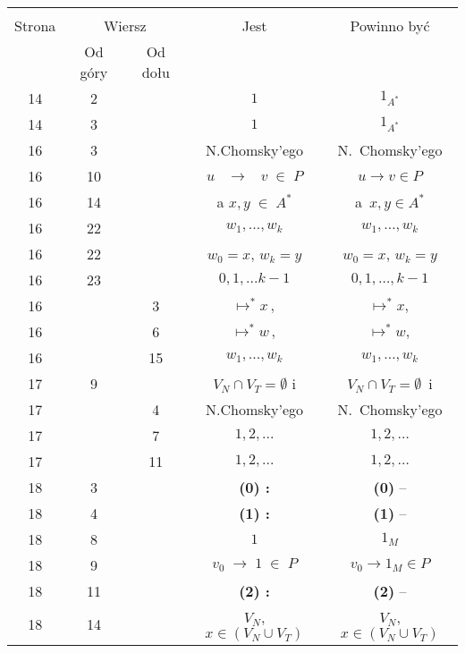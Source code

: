 \documentclass[a4paper,11pt]{article}
\begin{document}
\begin{center}
  \begin{tabular}{|c|c|c|c|c|}
    \hline
    & \multicolumn{2}{c|}{} & & \\
    Strona & \multicolumn{2}{c|}{Wiersz} & Jest
                              & Powinno być \\ \cline{2-3}
    & Od góry & Od dołu & & \\
    \hline
    14  &  2 & & $1$ & $1_{ A^{ * } }$ \\
    14  &  3 & & $1$ & $1_{ A^{ * } }$ \\
    16  &  3 & & N.Chomsky’ego & N.~Chomsky’ego \\
    16  & 10 & & $u \;\;\; \to \;\;\; v \; \in \; P$ & $u \to v \in P$ \\
    16  & 14 & & a{ }{ } $x, y \; \in \; A^{ * }$ & a~$x, y \in A^{ * }$ \\
    16  & 22 & & $w_{ 1 }, ..., w_{ k }$ & $w_{ 1 }, \ldots, w_{ k }$ \\
    16  & 22 & & $w_{ 0 } = x$,{ } $w_{ k } = y$
           & $w_{ 0 } = x$, $w_{ k } = y$ \\
    16  & 23 & & $0, 1, ...k - 1$ & $0, 1, \ldots, k - 1$ \\
    16  & &  3 & $\mapsto^{ * } x \, ,$ & $\mapsto^{ * } x,$ \\
    16  & &  6 & $\mapsto^{ * } w \, ,$ & $\mapsto^{ * } w,$ \\
    16  & & 15 & $w_{ 1 }, ..., w_{ k }$ & $w_{ 1 }, \ldots, w_{ k }$ \\
    17  &  9 & & $V_{ N } \cap V_{ T } = \emptyset${ }{ }{ }i
           & $V_{ N } \cap V_{ T } = \emptyset$~i \\
    17  & &  4 & N.Chomsky’ego & N.~Chomsky’ego \\
    17  & &  7 & $1, 2, ...$ & $1, 2, \ldots$ \\
    17  & & 11 & $1, 2, ...$ & $1, 2, \ldots$ \\
    18  &  3 & & \textbf{(0) :} & \textbf{(0)} -- \\
    18  &  4 & & \textbf{(1) :} & \textbf{(1)} -- \\
    18  &  8 & & $1$ & $1_{ M }$ \\
    18  &  9 & & $v_{ 0 } \; \to \; 1 \; \in \; P$
           & $v_{ 0 } \to 1_{ M } \in P$ \\
    18  & 11 & & \textbf{(2) :} & \textbf{(2)} -- \\
    18  & 14 & & $V_{ N }$,{ } $x \in ( V_{ N } \cup V_{ T } )$
           & $V_{ N }$, $x \in ( V_{ N } \cup V_{ T } )$ \\

\end{tabular}
\end{center}
\end{document}
